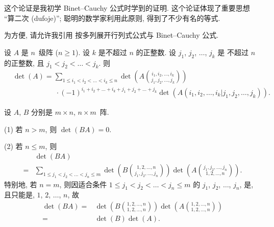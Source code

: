这个论证是我初学 Binet--Cauchy 公式时学到的证明.
这个论证体现了重要思想 ``算二次 (dufoje)'';
聪明的数学家利用此原则, 得到了不少有名的等式.

为方便, 请允许我引用%
按多列展开行列式公式与 Binet--Cauchy 公式.

\begin{theorem}
    设 \(A\) 是 \(n\)~级阵 (\(n \geq 1\)).
    设 \(k\) 是不超过 \(n\) 的正整数.
    设 \(j_1\), \(j_2\), \(\dots\), \(j_k\) 是%
    不超过 \(n\) 的正整数,
    且 \(j_1 < j_2 < \dots < j_k\).
    则
    \begin{align*}
         &
        \det {(A)}
        = \sum_{1 \leq i_1 < i_2 < \dots < i_k \leq n}
        {\det {\left(
                A\binom{i_1, i_2, \dots, i_k}
                {j_1, j_2, \dots, j_k}
                \right)}}
        \\
         &
        \qquad \qquad \qquad
        \cdot (-1)^{i_1 + i_2 + \dots + i_k
            + j_1 + j_2 + \dots + j_k}
        \det {(A({i_1,i_2,\dots,i_k}|{j_1,j_2,\dots,j_k}))}.
    \end{align*}
\end{theorem}

\begin{theorem}
    设 \(A\), \(B\) 分别是 \(m \times n\), \(n \times m\)~阵.

    (1)
    若 \(n > m\), 则 \(\det {(BA)} = 0\).

    (2)
    若 \(n \leq m\),
    则
    \begin{align*}
             & \det {(BA)}
        \\
        = {} & \sum_{1 \leq j_1 < j_2 < \dots < j_n \leq m}
        {
            \det {\left(
                B\binom{1, 2, \dots, n}{j_1, j_2, \dots, j_n}
                \right)}
            \det {\left(
                A\binom{j_1, j_2, \dots, j_n}{1, 2, \dots, n}
                \right)}
        }.
    \end{align*}
    特别地, 若 \(n = m\), 则因适合条件
    \(1 \leq j_1 < j_2 < \dots < j_n \leq m\)
    的 \(j_1\), \(j_2\), \(\dots\), \(j_n\),
    是, 且只能是,
    \(1\), \(2\), \(\dots\), \(n\),
    故
    \begin{align*}
        \det {(BA)}
        = {} &
        \det {\left(
            B\binom{1, 2, \dots, n}{1, 2, \dots, n}
            \right)}
        \det {\left(
            A\binom{1, 2, \dots, n}{1, 2, \dots, n}
            \right)}
        \\
        = {} & \det {(B)} \det {(A)}.
    \end{align*}
\end{theorem}

